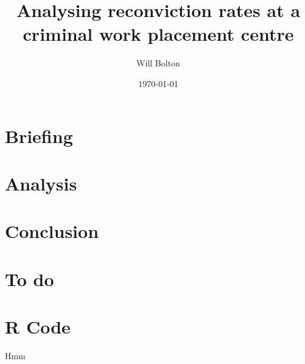 \documentclass{article}
\title{Analysing reconviction rates at a criminal work placement centre}
\author{Will Bolton}
\date{\today}
\begin{document}
\maketitle
\tableofcontents

\section{Briefing}
\lipsum[1-3]

\section{Analysis}
\lipsum[4-6]

\section{Conclusion}
\lipsum[7-9]

\section{To do}
\listoftodos

\appendix
\section{R Code}
Hmm
%
\end{document}
